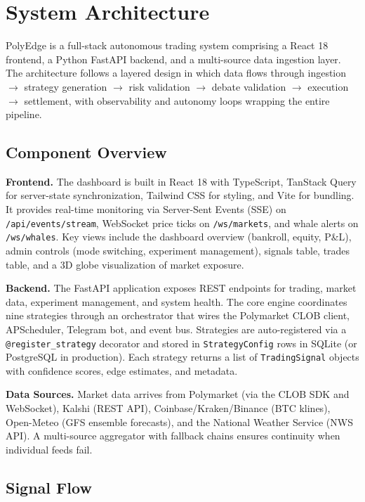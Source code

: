 \section{System Architecture}\label{sec:architecture}

PolyEdge is a full-stack autonomous trading system comprising a React 18 frontend, a Python FastAPI backend, and a multi-source data ingestion layer. The architecture follows a layered design in which data flows through ingestion $\to$ strategy generation $\to$ risk validation $\to$ debate validation $\to$ execution $\to$ settlement, with observability and autonomy loops wrapping the entire pipeline.

\subsection{Component Overview}

\textbf{Frontend.} The dashboard is built in React 18 with TypeScript, TanStack Query for server-state synchronization, Tailwind CSS for styling, and Vite for bundling. It provides real-time monitoring via Server-Sent Events (SSE) on \texttt{/api/events/stream}, WebSocket price ticks on \texttt{/ws/markets}, and whale alerts on \texttt{/ws/whales}. Key views include the dashboard overview (bankroll, equity, P\&L), admin controls (mode switching, experiment management), signals table, trades table, and a 3D globe visualization of market exposure.

\textbf{Backend.} The FastAPI application exposes REST endpoints for trading, market data, experiment management, and system health. The core engine coordinates nine strategies through an orchestrator that wires the Polymarket CLOB client, APScheduler, Telegram bot, and event bus. Strategies are auto-registered via a \texttt{@register\_strategy} decorator and stored in \texttt{StrategyConfig} rows in SQLite (or PostgreSQL in production). Each strategy returns a list of \texttt{TradingSignal} objects with confidence scores, edge estimates, and metadata.

\textbf{Data Sources.} Market data arrives from Polymarket (via the CLOB SDK and WebSocket), Kalshi (REST API), Coinbase/Kraken/Binance (BTC klines), Open-Meteo (GFS ensemble forecasts), and the National Weather Service (NWS API). A multi-source aggregator with fallback chains ensures continuity when individual feeds fail.

\subsection{Signal Flow}

